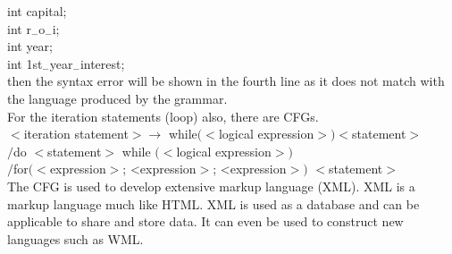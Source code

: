 \documentclass[a4,9pt]{beamer}
\begin{document}
\begin{frame}
\hspace*{1cm} int capital;\\
\hspace*{1cm} int r$_{-}$o$_{-}$i;\\
\hspace*{1cm} int year;\\
\hspace*{1cm} int 1st$_{-}$year$_{-}$interest;\\

\vspace*{0.2cm}
then the syntax error will be shown in the fourth line as it does not match with the language produced
by the grammar.\\
\hspace*{0.5cm} For the iteration statements (loop) also, there are CFGs.\\

\vspace*{0.2cm}
\hspace*{1cm} $<$iteration statement$> \rightarrow$ while$(<$logical expression$>) <$statement$>$ \\
\hspace*{2.2cm} $/$do $<$statement$>$ while $(<$logical expression$>)$ \\
\hspace*{2.2cm} $/$for$(<$expression$>$; <expression$>$; <expression$>)$ $<$statement$>$ \\

\vspace*{0.2cm}
\hspace*{0.5cm} The CFG is used to develop extensive markup language (XML). XML is a markup language much
like HTML. XML is used as a database and can be applicable to share and store data. It can even be used
to construct new languages such as WML.\\
\end{frame}
\end{document}
